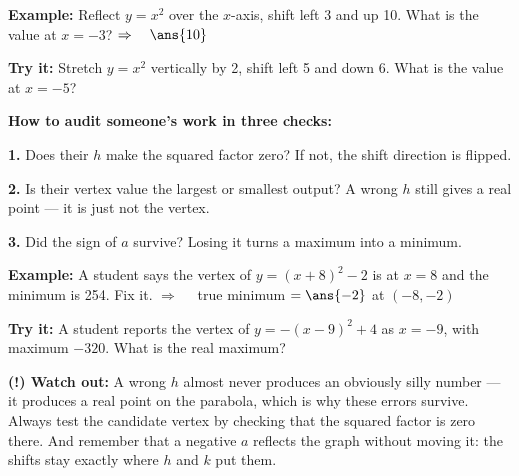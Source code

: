 \documentclass[12pt]{article}
\begin{document}
\begin{examplebox}
\textbf{Example:} \quad Reflect $y = x^2$ over the $x$-axis, shift left 3 and up 10. What is the value at $x = -3$?
$\Rightarrow\quad \ans{10}$
\end{examplebox}

\begin{tryitbox}
\textbf{Try it:} \quad Stretch $y = x^2$ vertically by 2, shift left 5 and down 6. What is the value at $x = -5$?\\[2pt]
\end{tryitbox}


\begin{formulabox}
\textbf{How to audit someone's work in three checks:}
\par\textbf{1.} Does their $h$ make the squared factor zero? If not, the shift direction is flipped.
\par\textbf{2.} Is their vertex value the largest or smallest output? A wrong $h$ still gives a real point --- it is just not the vertex.
\par\textbf{3.} Did the sign of $a$ survive? Losing it turns a maximum into a minimum.
\end{formulabox}

\begin{examplebox}
\textbf{Example:} \quad A student says the vertex of $y = (x + 8)^2 - 2$ is at $x = 8$ and the minimum is 254. Fix it.
$\Rightarrow\quad$ true minimum $= \ans{-2}$ at $(-8, -2)$
\end{examplebox}

\begin{tryitbox}
\textbf{Try it:} \quad A student reports the vertex of $y = -(x - 9)^2 + 4$ as $x = -9$, with maximum $-320$. What is the real maximum?\\[2pt]
\end{tryitbox}

\begin{watchoutbox}
\textbf{(!) Watch out:} A wrong $h$ almost never produces an obviously silly number --- it
produces a real point on the parabola, which is why these errors survive. Always test the
candidate vertex by checking that the squared factor is zero there. And remember that a
negative $a$ reflects the graph without moving it: the shifts stay exactly where $h$ and
$k$ put them.
\end{watchoutbox}
\end{document}
